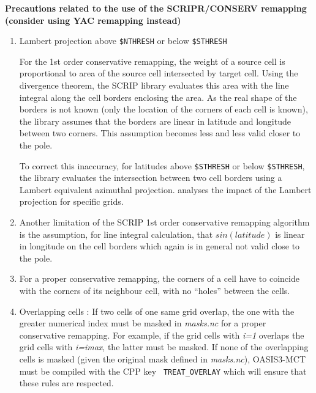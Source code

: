   {\bf Precautions related to the use of the SCRIPR/CONSERV remapping (consider using YAC remapping instead)}
 \begin{enumerate}
 
  \item Lambert projection above {\tt \$NTHRESH} or below {\tt \$STHRESH} 
    
    For the 1st order conservative remapping, the weight of a
    source cell is proportional to area of the source cell intersected
    by target cell.  Using the divergence theorem, the SCRIP library
    evaluates this area with the line integral along the cell borders
    enclosing the area. As the real shape of the borders is not known
    (only the location of the corners of each cell is known), the
    library assumes that the borders are linear in latitude and
    longitude between two corners.  This assumption becomes less and less valid
    closer to the pole. 
    
    To correct this inaccuracy, for latitudes above {\tt \$STHRESH}
    or below  {\tt \$STHRESH}, the library evaluates
    the intersection between two cell borders using a Lambert
    equivalent azimuthal projection. 
        \cite{valcke19} analyses the impact of the Lambert projection for specific grids.
  
  \item Another limitation of the SCRIP 1st order conservative
    remapping algorithm is the assumption, for line integral
    calculation, that $sin(latitude)$ is linear in longitude on the
    cell borders which again is in general not valid close to the
    pole.

  \item For a proper conservative remapping, the corners of a cell have
    to coincide with the corners of its neighbour cell, with no
    ``holes'' between the cells.
  
  \item Overlapping cells :
  If two cells of one same grid overlap, the one with
    the greater numerical index must be masked in {\it
      masks.nc} for a proper conservative remapping.  For example, 
     if the grid cells with {\it i=1} overlaps the grid cells with {\it i=imax}, the latter must
    be masked.  If none of the overlapping cells is masked (given the
    original mask defined in {\it
      masks.nc}), OASIS3-MCT must be compiled with the CPP key {\tt
      TREAT\_OVERLAY} which will ensure that these rules are
    respected.
    

\end{enumerate}
